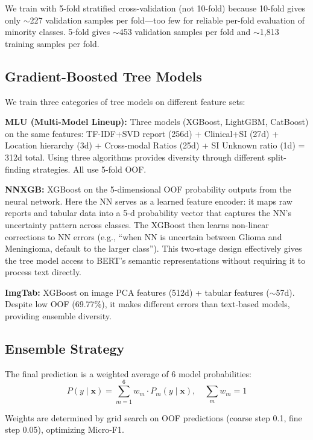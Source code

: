 We train with 5-fold stratified cross-validation (not 10-fold) because 10-fold gives only $\sim$227 validation samples per fold---too few for reliable per-fold evaluation of minority classes. 5-fold gives $\sim$453 validation samples per fold and $\sim$1,813 training samples per fold.

\subsection{Gradient-Boosted Tree Models}
\label{sec:tree}

We train three categories of tree models on different feature sets:

\textbf{MLU (Multi-Model Lineup):} Three models (XGBoost, LightGBM, CatBoost) on the same features: TF-IDF+SVD report (256d) + Clinical+SI (27d) + Location hierarchy (3d) + Cross-modal Ratios (25d) + SI Unknown ratio (1d) = 312d total. Using three algorithms provides diversity through different split-finding strategies. All use 5-fold OOF.

\textbf{NNXGB:} XGBoost on the 5-dimensional OOF probability outputs from the neural network. Here the NN serves as a learned feature encoder: it maps raw reports and tabular data into a 5-d probability vector that captures the NN's uncertainty pattern across classes. The XGBoost then learns non-linear corrections to NN errors (e.g., ``when NN is uncertain between Glioma and Meningioma, default to the larger class''). This two-stage design effectively gives the tree model access to BERT's semantic representations without requiring it to process text directly.

\textbf{ImgTab:} XGBoost on image PCA features (512d) + tabular features ($\sim$57d). Despite low OOF (69.77\%), it makes different errors than text-based models, providing ensemble diversity.

\subsection{Ensemble Strategy}
\label{sec:ensemble}

The final prediction is a weighted average of 6 model probabilities:
\begin{equation}
P(y \mid \mathbf{x}) = \sum_{m=1}^{6} w_m \cdot P_m(y \mid \mathbf{x}), \quad \sum_{m} w_m = 1
\end{equation}

Weights are determined by grid search on OOF predictions (coarse step 0.1, fine step 0.05), optimizing Micro-F1.

